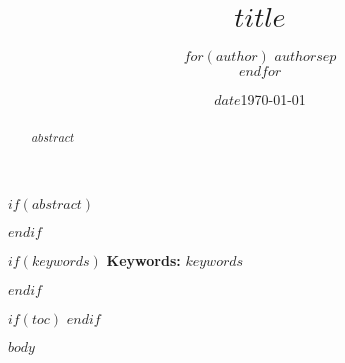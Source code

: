\documentclass[11pt,a4paper]{article}
\title{\textbf{$title$}}
\author{
$for(author)$
  $author$$sep$ \\
$endfor$
}
\date{$date$}
\date{\today}
\begin{document}
\maketitle

$if(abstract)$
\begin{abstract}
$abstract$
\end{abstract}
$endif$

$if(keywords)$
\noindent\textbf{Keywords:} $keywords$

\vspace{1em}
$endif$

$if(toc)$
\tableofcontents
\newpage
$endif$

$body$
\end{document}
